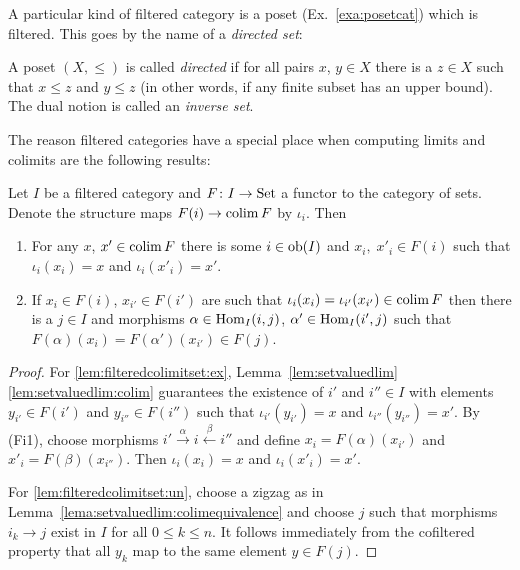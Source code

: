 \documentclass[a4paper,openany]{scrbook}
\begin{document}
A particular kind of filtered category is a poset (Ex.~\ref{exa:posetcat}) which is filtered. This goes by the name of a \emph{directed set}:

\begin{defn}
A poset $(X,\leq)$ is called \emph{directed} if for all pairs $x$, $y \in X$ there is a $z \in X$ such that $x \leq z$ and $y \leq z$ (in other words, if any finite subset has an upper bound). The dual notion is called an \emph{inverse set}.
\end{defn}

The reason filtered categories have a special place when computing limits and colimits are the following results:

\begin{lemma} \label{lemma:filteredcolimitset}
Let $I$ be a filtered category and $F\colon I \to \operatorname{Set}$ a functor to the category of sets. Denote the structure maps $F(i) \to \operatorname*{colim} F$ by $\iota_i$. Then
\begin{enumerate}
\item For any $x$, $x' \in \operatorname*{colim} F$ there is some $i \in \operatorname{ob}(I)$ and $x_i,\; x'_i \in F(i)$ such that $\iota_i(x_i)=x$ and $\iota_i(x'_i)=x'$. \label{lem:filteredcolimitset:ex}
\item If $x_i \in F(i)$, $x_{i'} \in F(i')$ are such that $\iota_i(x_i) = \iota_{i'}(x_{i'}) \in \operatorname*{colim} F$ then there is a $j \in I$ and morphisms $\alpha \in \operatorname{Hom}_I(i,j)$, $\alpha' \in \operatorname{Hom}_I(i',j)$ such that $F(\alpha)(x_i) = F(\alpha')(x_{i'}) \in F(j)$. \label{lem:filteredcolimitset:un}
\end{enumerate}
\end{lemma}
\begin{proof}
For \eqref{lem:filteredcolimitset:ex}, Lemma~\ref{lem:setvaluedlim}\eqref{lem:setvaluedlim:colim} guarantees the existence of $i'$ and $i'' \in I$ with elements $y_{i'} \in F(i')$ and $y_{i''} \in F(i'')$ such that $\iota_{i'}(y_{i'}) = x$ and $\iota_{i''}(y_{i''}) = x'$. By (Fi1), choose morphisms $i' \xrightarrow{\alpha} i \xleftarrow{\beta} i''$ and define $x_i = F(\alpha)(x_{i'})$ and $x'_i = F(\beta)(x_{i''})$. Then $\iota_i(x_i)=x$ and $\iota_i(x'_i)=x'$.

For \eqref{lem:filteredcolimitset:un}, choose a zigzag as in Lemma~\ref{lema:setvaluedlim:colimequivalence} and choose $j$ such that morphisms $i_k \to j$ exist in $I$ for all $0 \leq k \leq n$. It follows immediately from the cofiltered property that all $y_{k}$ map to the same element $y \in F(j)$.
\end{proof}
\end{document}
